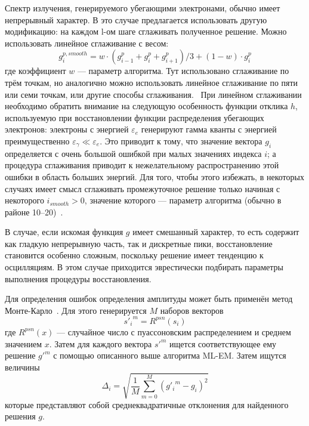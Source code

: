 Спектр излучения, генерируемого убегающими электронами, обычно имеет непрерывный характер. В это случае предлагается использовать другую модификацию: на каждом l-ом шаге сглаживать полученное решение. Можно использовать линейное сглаживание с весом:
\begin{equation*}
  g^{p, smooth}_i = w \cdot \left( g^p_{i-1} + g^p_i + g^p_{i+1} \right)/3 + ( 1 - w ) \cdot g^p_i
\end{equation*}
где коэффициент $w$ --- параметр алгоритма. Тут использовано сглаживание по трём точкам, но аналогично можно использовать линейное сглаживание по пяти или семи точкам, или другие способы сглаживания.~\cite{Khilkevitch2013} При линейном сглаживании необходимо обратить внимание на следующую особенность функции отклика $h$, используемую при восстановлении функции распределения убегающих электронов: электроны с энергией $\varepsilon_e$ генерируют гамма кванты с энергией преимущественно $\varepsilon_{\gamma} \ll \varepsilon_e$. Это приводит к тому, что значение вектора $g_i$ определяется с очень большой ошибкой при малых значениях индекса $i$; а процедура сглаживания приводит к нежелательному распространению этой ошибки в область больших энергий. Для того, чтобы этого избежать, в некоторых случаях имеет смысл сглаживать промежуточное решение только начиная с некоторого $i_{smooth} > 0$, значение которого --- параметр алгоритма (обычно в районе 10--20)~\cite{Khilkevitch2013}.

В случае, если искомая функция $g$ имеет смешанный характер, то есть содержит как гладкую непрерывную часть, так и дискретные пики, восстановление становится особенно сложным, поскольку решение имеет тенденцию к осцилляциям. В этом случае приходится эврестически подбирать параметры выполнения процедуры восстановления.

Для определения ошибок определения амплитуды может быть применён метод Монте-Карло~\cite{Shirk1985}. Для этого генерируется $M$ наборов векторов 
\begin{equation*}
  {{s'}_i}^{m} = R^{psn}(s_i)
\end{equation*}
где $ R^{psn}(x) $ --- случайное число с пуассоновским распределением и среднем значением $x$. Затем для каждого вектора ${s'}^{m}$ ищется соответствующее ему решение ${g'}^{m}$ с помощью описанного выше алгоритма ML-EM. Затем ищутся величины
\begin{equation*}
  \Delta_i = \sqrt{ \frac{1}{M} \sum \limits_{ m = 0 }^{M} \left( {g'_i}^{m} - g_i \right)^2 }
\end{equation*}
которые представляют собой среднеквадратичные отклонения для найденного решения $g$.~\cite{Shevelev2013}


